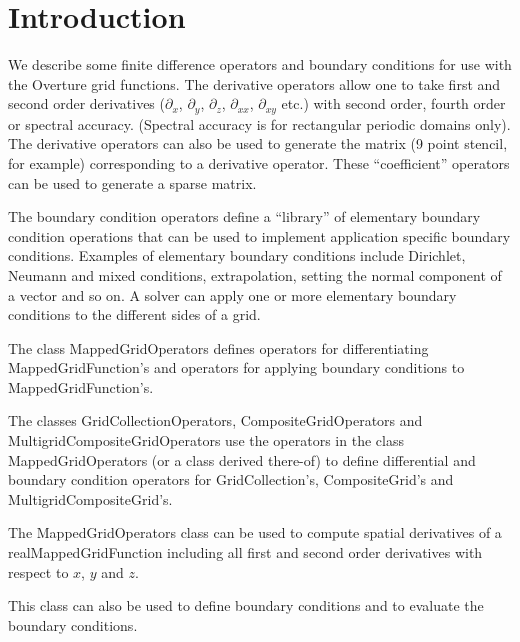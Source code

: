 \documentclass[12pt]{article}
\newcommand{\GC}{Grid\-Collection}
\newcommand{\CG}{Composite\-Grid}
\newcommand{\MGCG}{Multigrid\-Composite\-Grid}
\newcommand{\MGO}{MappedGridOperators}
\newcommand{\GCO}{Grid\-Collection\-Operators}
\newcommand{\CGO}{Composite\-Grid\-Operators}
\newcommand{\MGCGO}{Multigrid\-Composite\-Grid\-Operators}
\begin{document}
\tableofcontents

\vfill\eject

\section{Introduction}

We describe some finite difference operators and boundary conditions for
use with the Overture grid functions. 
The derivative operators allow one to take first and second order derivatives
($\partial_x$, $\partial_y$, $\partial_z$, $\partial_{xx}$, $\partial_{xy}$ etc.)
with second order, fourth order or spectral accuracy.  (Spectral accuracy is
for rectangular periodic domains only). 
The derivative operators can also be used
to generate the matrix (9 point stencil, for example) 
corresponding to a derivative operator. These ``coefficient'' operators can be used
to generate a sparse matrix.

The boundary condition operators define a ``library'' of elementary boundary
condition operations that can be used to implement application specific
boundary conditions. Examples of elementary boundary conditions include
Dirichlet, Neumann and mixed conditions, extrapolation, setting the normal
component of a vector and so on. A solver can apply one or more elementary
boundary conditions to the different sides of a grid.



The class {\ff \MGO} defines operators
for differentiating MappedGridFunction's and operators for applying
boundary conditions to MappedGridFunction's.

The classes {\ff \GCO}, {\ff \CGO} and {\ff \MGCGO} use the
operators in the class {\ff \MGO} (or a class derived there-of)
to define differential
and boundary condition operators for {\ff \GC}'s, 
{\ff \CG}'s and {\ff \MGCG}'s.

The {\ff \MGO} class can be used to compute spatial derivatives of a
{\ff realMappedGridFunction} including all first and 
second order derivatives
with respect to $x$, $y$ and $z$.

This class can also be used to define boundary conditions
and to evaluate the boundary conditions.
\end{document}
